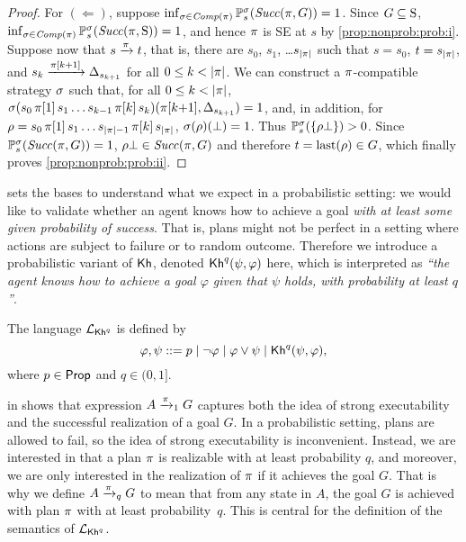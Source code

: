 \begin{proof}
  For $(\Leftarrow)$, suppose
  $\inf_{\strat\in\Comp(\plan)}\Prob^\strat_s(\Succ(\plan,G))=1$.
  Since $G\subseteq\S$,
  $\inf_{\strat\in\Comp(\plan)}\Prob^\strat_s(\Succ(\plan,\S))=1$, and
  hence $\plan$ is SE at $s$ by \cref{prop:nonprob:prob:i}.
  Suppose now that $s \reach{\plan} t$, that is, there are $s_0$,
  $s_1$, \ldots $s_{\size{\plan}}$ such that $s=s_0$, $t=s_{\size{\plan}}$, and
  $s_k\reach{\plan[k{+}1]}\Dirac_{s_{k{+}1}}$ for all $0\leq k < \size{\plan}$.
  We can construct a $\plan$-compatible strategy $\strat$
  such that, for all $0\leq k < \size{\plan}$,
  $\strat(s_0\,\plan[1]\,s_1\ldots s_{k{-}1}\,\plan[k]\,s_k)(\plan[k{+}1],\Dirac_{s_{k{+}1}})=1$,
  and, in addition, for
  $\rho = s_0\,\plan[1]\,s_1\ldots s_{\size{\plan}{-}1}\,\plan[k]\,s_{\size{\plan}}$,
  $\strat(\rho)(\complete)=1$.
  Thus $\Prob^\strat_s(\{\rho\bot\})>0$.  Since
  $\Prob^\strat_s(\Succ(\plan,G))=1$, $\rho\bot\in\Succ(\plan,G)$
  and therefore $t=\last(\rho)\in G$, which finally proves
  \cref{prop:nonprob:prob:ii}.
\end{proof}


 sets the bases to understand what we expect in
a probabilistic setting: we would like to validate whether an agent
knows how to achieve a goal \emph{with at least some given probability
of success}.  That is, plans might not be perfect in a setting where
actions are subject to failure or to random outcome.
%
Therefore we introduce a probabilistic variant of $\kh$,
denoted $\kh^q(\psi,\varphi)$ here, which is interpreted as \emph{``the agent knows
how to achieve a goal $\varphi$ given that $\psi$ holds, with
probability at least $q$''}.


\begin{definition}\label{def:syntax:PKh}
  The language $\PKh$ is defined by
  \[
  \varphi, \psi ::=
  p \mid \neg \varphi \mid \varphi \vee \psi \mid \kh^q(\psi,\varphi),
  \]
  where $p\in\Prop$ and $q\in(0,1]$.
\end{definition}


 in  shows that
expression $A\reach{\plan}_1 G$ captures both the idea of strong
executability and the successful realization of a goal $G$.  In a
probabilistic setting, plans are allowed to fail, so the idea of
strong executability is inconvenient.  Instead, we are interested in that
a plan $\plan$ is realizable with at least probability $q$, and
moreover, we are only interested in the realization of $\plan$ if it
achieves the goal $G$.  That is why we define $A\reach{\plan}_q G$ to
mean that from any state in $A$, the goal $G$ is achieved with plan
$\plan$ with at least probability~$q$.  This is central for the
definition of the semantics of $\PKh$.

